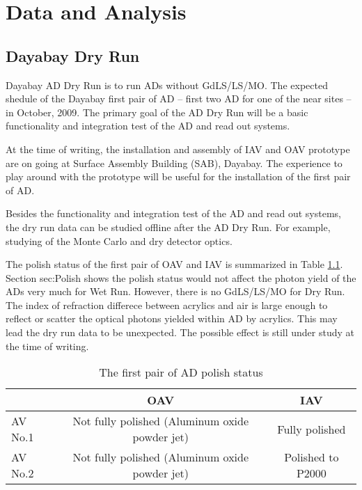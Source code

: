 \chapter {Data and Analysis}
\section {Dayabay Dry Run}

Dayabay AD Dry Run is to run ADs without GdLS/LS/MO.
The expected shedule of the Dayabay first pair of AD -- first two AD for one of the near sites --
in October, 2009. The primary goal of the AD Dry Run will be a basic functionality and integration test of the AD and read out systems.

At the time of writing, the installation and assembly of IAV and OAV prototype are on going at Surface Assembly Building (SAB), Dayabay.
The experience to play around with the prototype will be useful for the installation of the first pair of AD.

Besides the functionality and integration test of the AD and read out systems, the dry run data can be studied offline
after the AD Dry Run. For example, studying of the Monte Carlo and dry detector optics.

The polish status of the first pair of OAV and IAV is summarized in Table \ref{tab:ADPolishStatus}.
Section {sec:Polish} shows the polish status would not affect the photon yield of the ADs
very much for Wet Run. However, there is no GdLS/LS/MO for Dry Run. The index of refraction
differece between acrylics and air is large enough to reflect or scatter the optical photons
yielded within AD by acrylics. This may lead the dry run data to be unexpected.
The possible effect is still under study at the time of writing.


\begin{table}
\centering
\caption{The first pair of AD polish status}
\label{tab:ADPolishStatus}
\begin{tabular}{lcc}
\hline
 & OAV & IAV\\
\hline
\hline
AV No.1 &   Not fully polished (Aluminum oxide powder jet) &   Fully polished  \\
AV No.2 &   Not fully polished (Aluminum oxide powder jet) &   Polished to P2000   \\
\hline
\end{tabular}
\end{table}




